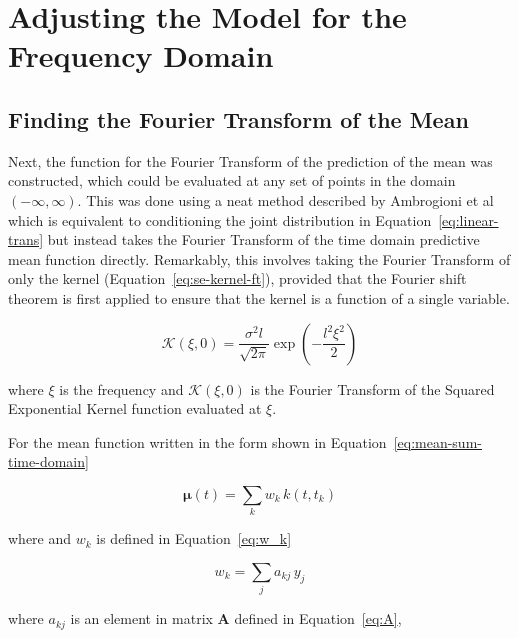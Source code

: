\documentclass[12pt]{article}
\begin{document}
    \section{Adjusting the Model for the Frequency Domain}

    \subsection{Finding the Fourier Transform of the Mean}
    Next, the function for the Fourier Transform of the prediction of the mean was constructed, which could be evaluated at any set of points in the domain $(-\infty, \infty)$.
    This was done using a neat method described by Ambrogioni et al~\cite{Ambrogioni2018} which is equivalent to conditioning the joint distribution in Equation~\ref{eq:linear-trans} but instead takes the Fourier Transform of the time domain predictive mean function directly.
    Remarkably, this involves taking the Fourier Transform of only the kernel (Equation~\ref{eq:se-kernel-ft}), provided that the Fourier shift theorem is first applied to ensure that the kernel is a function of a single variable.

    \begin{equation}
        \mathcal{K}(\xi,0) = \frac{\sigma^2 l}{\sqrt{2 \pi}} \exp\left(-\frac{l^2 \xi^2}{2}\right) \label{eq:se-kernel-ft}
    \end{equation}

    \noindent where $\xi$ is the frequency and $\mathcal{K}(\xi,0)$ is the Fourier Transform of the Squared Exponential Kernel function evaluated at $\xi$.

    For the mean function written in the form shown in Equation~\ref{eq:mean-sum-time-domain}

    \begin{equation}
        \mathbf{\mu}(t) = \sum_{k} w_k \, k(t,t_k) \label{eq:mean-sum-time-domain}
    \end{equation}

    \noindent where and $w_k$ is defined in Equation~\ref{eq:w_k}

    \begin{equation}
        w_k = \sum_{j} a_{kj} \, y_j \label{eq:w_k}
    \end{equation}

    \noindent where $a_{kj}$ is an element in matrix $\mathbf{A}$ defined in Equation~\ref{eq:A},
\end{document}
